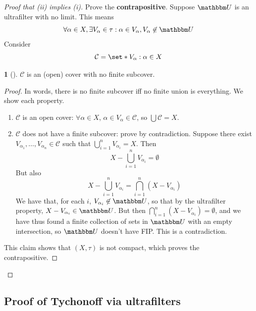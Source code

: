 \documentclass[11pt]{article}
\numberwithin{equation}{section}
\newcounter{theo}[section]\setcounter{theo}{0}
\theoremstyle{definition}
\newtheorem{claim}{\color{ForestGreen}{\textbf{Claim}}}[section]
\theoremstyle{definition}
\def\Set{\set*}%
\newcommand{\1}{\mathbbm 1}
\def\t{\tau}
\newcommand{\UU}{\mathbbm U}
\newcommand{\cC}{\mathcal C}
\begin{document}
\begin{proof}[Proof that (ii) implies (i)]
	Prove the \textbf{contrapositive}. Suppose $\UU$ is an ultrafilter with no limit. This means
	\begin{equation}
		\forall \alpha \in X, \exists V_\alpha \in \t : \alpha \in V_\alpha, V_\alpha \not\in \UU
	\end{equation}
	Consider
	\begin{equation}
		\cC = \Set{V_\alpha : \alpha \in X}
	\end{equation}
	\begin{claim}[]
		$\cC$ is an (open) cover with no finite subcover.  
	\end{claim}
	\begin{proof}
		In words, there is no finite subcover iff no finite union is everything. We show each property.
		\begin{enumerate}
			\item $\cC$ is an open cover: $\forall \alpha\in X$, $\alpha \in V_\alpha \in \cC$, so $\bigcup \cC = X$.
			\item $\cC$ does not have a finite subcover: prove by contradiction. Suppose there exist $V_{\alpha_1},\ldots,V_{\alpha_n} \in \cC$ such that $\bigcup_{i=1}^n V_{\alpha_i} = X$. Then
			\begin{equation}
				X - \bigcup_{i=1}^n V_{\alpha_i} = \emptyset
			\end{equation}
			But also
			\begin{equation}
				X - \bigcup_{i=1}^n V_{\alpha_i} = \bigcap_{i=1}^n (X - V_{\alpha_i})
			\end{equation}
			We have that, for each $i$, $V_{\alpha_i} \not\in \UU$, so that by the ultrafilter property, $X - V_{\alpha_i} \in \UU$. But then $\bigcap_{i=1}^n (X - V_{\alpha_i}) = \emptyset$, and we have thus found a finite collection of sets in $\UU$ with an empty intersection, so $\UU$ doesn't have FIP. This is a contradiction. 
		\end{enumerate}

		This claim shows that $(X,\t)$ is not compact, which proves the contrapositive. 
	\end{proof}
	
\end{proof}



\subsection{Proof of Tychonoff via ultrafilters}
\end{document}
